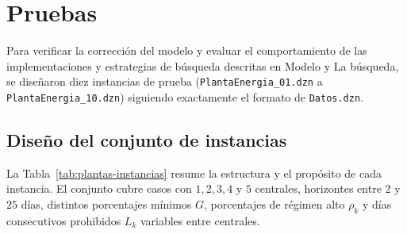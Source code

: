 \section{Pruebas}

Para verificar la correcci\'on del modelo y evaluar el comportamiento de las implementaciones y estrategias de b\'usqueda descritas en Modelo y La b\'usqueda, se dise\~naron diez instancias de prueba (\texttt{PlantaEnergia\_01.dzn} a \texttt{PlantaEnergia\_10.dzn}) siguiendo exactamente el formato de \texttt{Datos.dzn}.

\subsection{Dise\~no del conjunto de instancias}

La Tabla~\ref{tab:plantas-instancias} resume la estructura y el prop\'osito de cada instancia. El conjunto cubre casos con $1, 2, 3, 4$ y $5$ centrales, horizontes entre $2$ y $25$ d\'ias, distintos porcentajes m\'inimos $G$, porcentajes de r\'egimen alto $\rho_k$ y d\'ias consecutivos prohibidos $L_k$ variables entre centrales.

